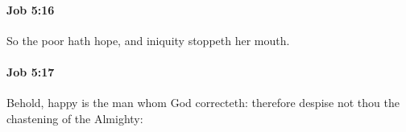		\paragraph{Job 5:16} %
			\label{JOB-5-16}

			So the poor hath hope, and iniquity stoppeth her mouth.


		\paragraph{Job 5:17} %
			\label{JOB-5-17}

			Behold, happy is the man whom God correcteth: therefore despise not thou the chastening of the Almighty:


